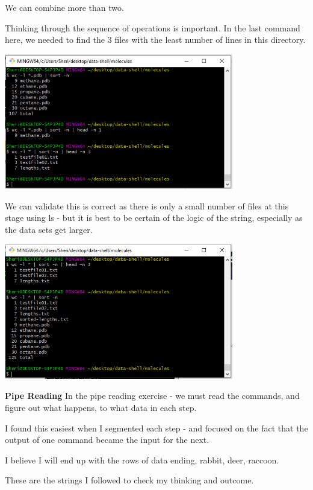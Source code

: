 \documentclass{article}
\begin{document}
We can combine more than two. 

Thinking through the sequence of operations is important. In the last command here, we needed to find the 3 files with the least number of lines in this directory. 

\includegraphics[width=10cm]{Images/GitBash_037.PNG}

We can validate this is correct as there is only a small number of files at this stage using ls - but it is best to be certain of the logic of the string, especially as the data sets get larger.

\includegraphics[width=10cm]{Images/GitBash_038.PNG}

\textbf{Pipe Reading}
In the pipe reading exercise - we must read the commands, and figure out what happens, to what data in each step.

I found this easiest when I segmented each step - and focused on the fact that the output of one command became the input for the next. 

I believe I will end up with the rows of data ending, rabbit, deer, raccoon. 

These are the strings I followed to check my thinking and outcome. 
\end{document}
